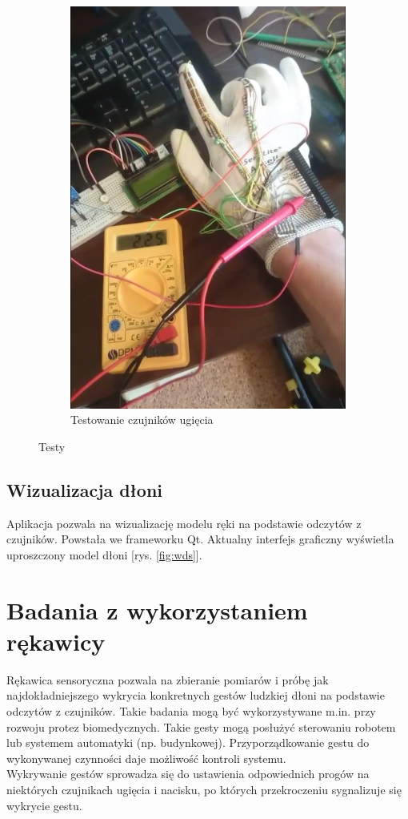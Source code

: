 \documentclass[12pt,a4paper]{article}
\begin{document}
\begin{figure}[htb!]
\begin{subfigure}{.5\textwidth}
	\includegraphics[width=.9\textwidth]{images/ugiecie.png}
	\caption{Testowanie czujników ugięcia}
	\label{fig:ugiecie}
\end{subfigure}
\caption{Testy}
\label{fig:testy}
\end{figure}


\subsection{Wizualizacja dłoni}
Aplikacja pozwala na wizualizację modelu ręki na podstawie odczytów z czujników. Powstała we frameworku Qt. Aktualny interfejs graficzny wyświetla uproszczony model dłoni [rys. \ref{fig:wds}].

\newpage
\section{Badania z wykorzystaniem rękawicy}
Rękawica sensoryczna pozwala na zbieranie pomiarów i próbę jak najdokładniejszego wykrycia konkretnych gestów ludzkiej dłoni na podstawie odczytów z czujników. Takie badania mogą być wykorzystywane m.in. przy rozwoju protez biomedycznych. Takie gesty mogą posłużyć sterowaniu robotem lub systemem automatyki (np. budynkowej). Przyporządkowanie gestu do wykonywanej czynności daje możliwość kontroli systemu.\\
Wykrywanie gestów sprowadza się do ustawienia odpowiednich progów na niektórych czujnikach ugięcia i nacisku, po których przekroczeniu sygnalizuje się wykrycie gestu.\\
\end{document}
